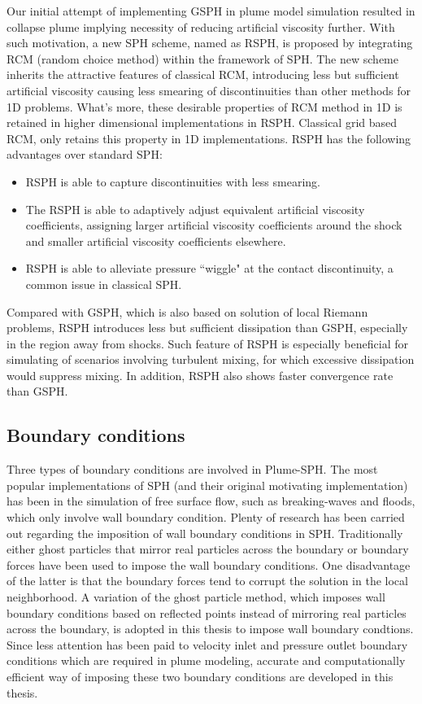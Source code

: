 Our initial attempt of implementing GSPH in plume model simulation resulted in collapse plume implying necessity of reducing artificial viscosity further. With such motivation, a new SPH scheme, named as RSPH, is proposed by integrating RCM (random choice method) within the framework of SPH. 
The new scheme inherits the attractive features  of classical RCM, introducing less but sufficient artificial viscosity causing less smearing of discontinuities than other methods for 1D problems. What's more, these desirable properties of RCM method in 1D is retained in higher dimensional implementations in RSPH. Classical grid based  RCM,  only retains this property in  1D implementations. 
RSPH has the following advantages over standard SPH:
\begin{itemize}
\item RSPH is able to capture discontinuities with less smearing.
\item The RSPH is able to adaptively adjust equivalent artificial viscosity coefficients, assigning larger artificial viscosity coefficients around the shock and smaller artificial viscosity coefficients elsewhere.
\item RSPH is able to alleviate pressure ``wiggle" at the contact discontinuity, a common issue in classical SPH.
\end{itemize}
Compared with GSPH, which is also based on solution of local Riemann problems, RSPH introduces less but sufficient dissipation than GSPH, especially in the region away from shocks. Such feature of RSPH is especially beneficial for simulating of scenarios involving turbulent mixing, for which excessive dissipation would suppress mixing. In addition, RSPH also shows faster convergence rate than GSPH. 

\subsection{Boundary conditions}
Three types of boundary conditions are involved in Plume-SPH. The most popular implementations of SPH (and their original motivating implementation) has been in the simulation of free surface flow, such as breaking-waves and floods, which only involve wall boundary condition. Plenty of research has been carried out regarding the imposition of wall boundary conditions in SPH. Traditionally either ghost particles that mirror real particles across the boundary \citep {ferrari2009new} or boundary forces \citep {monaghan2009sph} have been used to impose the wall boundary conditions. One disadvantage of the latter  is that the boundary forces tend to corrupt the solution in the local neighborhood. A variation \citep {kumar2013parallel} of the ghost particle method, which imposes wall boundary conditions based on reflected points instead of mirroring real particles across the boundary, is adopted in this thesis to impose wall boundary condtions. Since less attention has been paid to velocity inlet and pressure outlet boundary conditions which are required in plume modeling, accurate and computationally efficient way of imposing these two boundary conditions are developed in this thesis.


